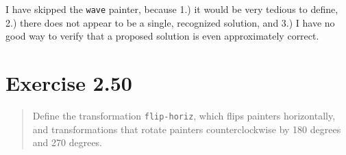 \documentclass{article}
\begin{document}


I have skipped the \texttt{wave} painter, because 1.) it would be very tedious
to define, 2.) there does not appear to be a single, recognized solution, and
3.) I have no good way to verify that a proposed solution is even approximately
correct.

\section{Exercise 2.50}
\begin{quote}
    Define the transformation \texttt{flip-horiz}, which flips painters
    horizontally, and transformations that rotate painters counterclockwise by
    180 degrees and 270 degrees.
\end{quote}


\end{document}
